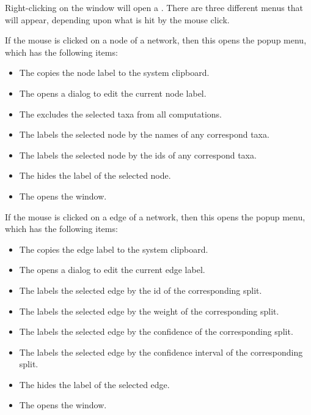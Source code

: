 \documentclass[11pt]{article}
\begin{document}

Right-clicking on the  window will open a .
There are three different menus that will appear, depending upon what is hit
by the mouse click.

If the mouse is clicked on a node of a network, then this opens
the  popup menu, which has the following items:
\begin{itemize}
\item The  copies the node label
to the system clipboard.
\item The  opens a dialog to edit the
current node label.
\item The  excludes the
selected taxa from all computations.
\item The  labels the selected node
by the names of any correspond taxa.
\item The  labels the selected node
by the ids of any correspond taxa.
\item The  hides the label of the selected
node.
\item The  opens the  window.
\end{itemize}

If the mouse is clicked on a edge of a network, then this opens
the  popup menu, which has the following items:
\begin{itemize}
\item The  copies the edge label
to the system clipboard.
\item The  opens a dialog to edit the
current edge label.
\item The  labels the selected edge
by the id of the corresponding split.
\item The  labels the selected edge
by the weight of the corresponding split.
\item The  labels the selected edge
by the confidence of the corresponding split.
\item The  labels the selected edge
by the confidence interval of the corresponding split.
\item The  hides the label of the selected
edge.
\item The  opens the  window.
\end{itemize}
\end{document}
